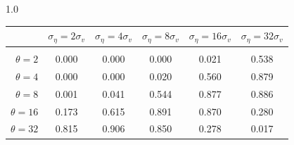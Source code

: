 \documentclass[12pt]{article}
\begin{document}
\begin{table}[h!]
\vspace{10pt}
\begin{subtable}{1.0\textwidth}
    \centering
\begin{tabular}{rccccc}
\hline  
            & \multicolumn{1}{l}{$\sigma_{\eta} =2\sigma_{v}$} & \multicolumn{1}{l}{$\sigma_{\eta} =4\sigma_{v}$} & \multicolumn{1}{l}{$\sigma_{\eta} =8\sigma_{v}$} & \multicolumn{1}{l}{$\sigma_{\eta} =16\sigma_{v}$} & \multicolumn{1}{l}{$\sigma_{\eta} =32\sigma_{v}$} \\ \hline  \vspace{-3mm} \\        
$\theta=2$  & 0.000                                             & 0.000                                             & 0.000                                             & 0.021                                              & 0.538                                              \\ \hline
$\theta=4$  & 0.000                                             & 0.000                                             & 0.020                                             & 0.560                                              & 0.879                                              \\ \hline
$\theta=8$  & 0.001                                             & 0.041                                             & 0.544                                             & 0.877                                              & 0.886                                              \\ \hline
$\theta=16$ & 0.173                                             & 0.615                                             & 0.891                                             & 0.870                                              & 0.280                                              \\ \hline
$\theta=32$ & 0.815                                             & 0.906                                             & 0.850                                             & 0.278                                              & 0.017                                              \\ \hline
\end{tabular}
\end{subtable}


\end{table}
\end{document}

